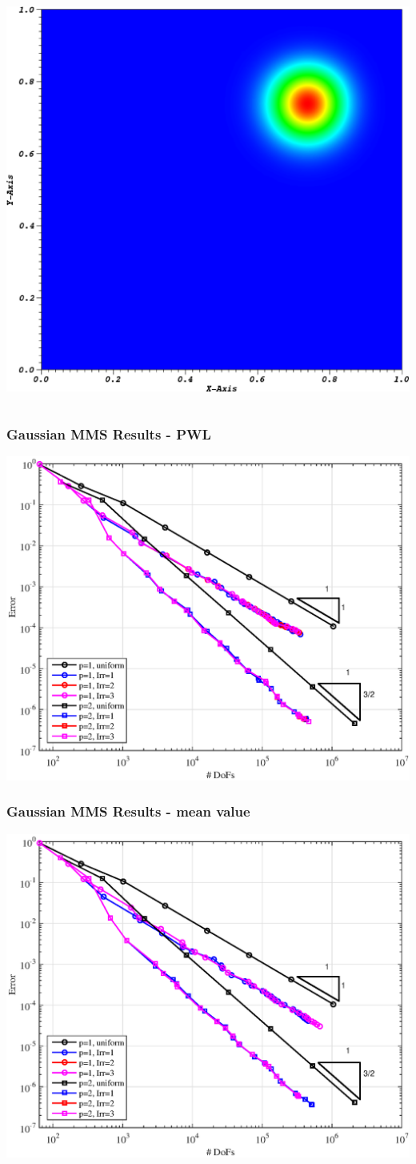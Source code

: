 \documentclass[compress,10pt]{beamer}
\begin{document}
\begin{frame}[t]
{\begin{columns}
{}\includegraphics[width=0.70\columnwidth]{images/ME2_cart_Irr=1_tol=0.1_cyc08_sol.eps}
\end{columns}
}
{
\frametitle{Gaussian MMS Results - PWL}
\hspace*{1.25cm}
{}\includegraphics[width=0.75\columnwidth]{images/TransportMMS_Gauss2D_PWL_Err.eps}
}
{
\frametitle{Gaussian MMS Results - mean value}
\hspace*{1.25cm}
{}\includegraphics[width=0.75\columnwidth]{images/TransportMMS_Gauss2D_MV_Err.eps}
}
\end{frame}
\end{document}
